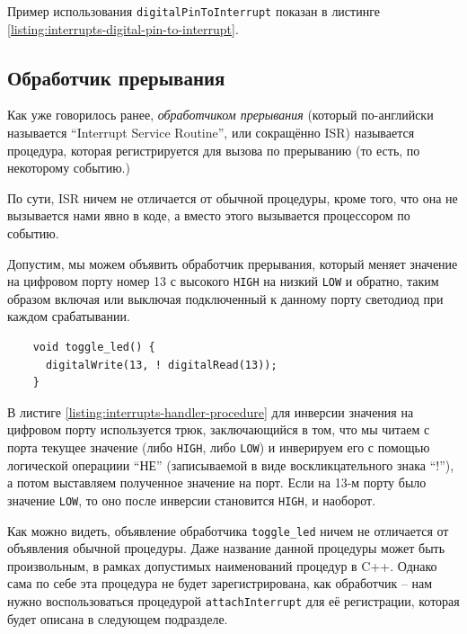 \documentclass[../sparc.tex]{subfiles}
\begin{document}
Пример использования \texttt{digitalPinToInterrupt} показан в листинге
\ref{listing:interrupts-digital-pin-to-interrupt}.

\subsection{Обработчик прерывания}
\label{subsection:isr}

Как уже говорилось ранее, \emph{обработчиком прерывания} (который по-английски
называется ``Interrupt Service Routine'', или сокращённо \gls{ISR}) называется
процедура, которая регистрируется для вызова по прерыванию (то есть, по
некоторому событию.)

По сути, ISR ничем не отличается от обычной процедуры, кроме того, что она не
вызывается нами явно в коде, а вместо этого вызывается процессором по событию.

Допустим, мы можем объявить обработчик прерывания, который меняет значение на
цифровом порту номер 13 с высокого \texttt{HIGH} на низкий
\texttt{LOW} и обратно, таким образом включая или выключая подключенный
к данному порту светодиод при каждом срабатывании.

\begin{listing}[ht]
  \begin{verbatim}
    void toggle_led() {
      digitalWrite(13, ! digitalRead(13));
    }
  \end{verbatim}
  \caption{Процедура, выполняющая роль обработчика прерывания}
  \label{listing:interrupts-handler-procedure}
\end{listing}

В листиге \ref{listing:interrupts-handler-procedure} для инверсии значения на
цифровом порту используется трюк, заключающийся в том, что мы читаем с порта
текущее значение (либо \texttt{HIGH}, либо \texttt{LOW}) и
инверируем его с помощью логической операциии ``НЕ'' (записываемой в виде
воскликцательного знака ``!''), а потом выставляем полученное значение на порт.
Если на 13-м порту было значение \texttt{LOW}, то оно после инверсии
становится \texttt{HIGH}, и наоборот.

Как можно видеть, объявление обработчика \texttt{toggle_led} ничем не
отличается от объявления обычной процедуры.  Даже название данной процедуры
может быть произвольным, в рамках допустимых наименований процедур в C++.
Однако сама по себе эта процедура не будет зарегистрирована, как обработчик --
нам нужно воспользоваться процедурой \texttt{attachInterrupt} для её
регистрации, которая будет описана в следующем подразделе.
\end{document}
